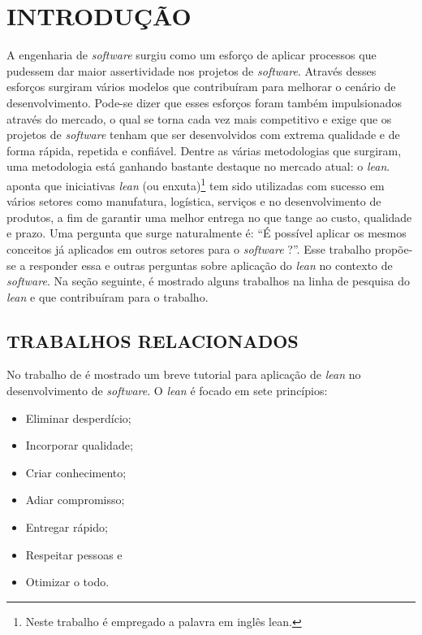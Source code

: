 \setcounter{page}{1}
\chapter{INTRODU\c{C}\~AO}  %
\label{chap:01}
A engenharia de \textit{software} surgiu como um esforço de aplicar processos que pudessem dar maior assertividade nos projetos de \textit{software}. Através desses esforços surgiram vários modelos que contribuíram para melhorar o cenário de desenvolvimento. Pode-se dizer que esses esforços foram também impulsionados através do mercado, o qual se torna cada vez mais competitivo e exige que os projetos de \textit{software} tenham que ser desenvolvidos com extrema qualidade e de forma rápida, repetida e confiável.
Dentre as várias metodologias que surgiram, uma metodologia está ganhando bastante destaque no mercado atual: o \textit{lean}.  aponta que iniciativas \textit{lean} (ou enxuta)\footnote{Neste trabalho é empregado a palavra em inglês lean.}  tem sido utilizadas com sucesso em vários setores como manufatura, logística, serviços e no desenvolvimento de produtos, a fim de garantir uma melhor entrega no que tange ao custo, qualidade e prazo. Uma pergunta que surge naturalmente é: “É possível aplicar os mesmos conceitos já aplicados em outros setores para o \textit{software} ?”. Esse trabalho propõe-se a responder essa e outras perguntas sobre aplicação do \textit{lean} no contexto de \textit{software}.
Na seção seguinte, é mostrado alguns trabalhos na linha de pesquisa do \textit{lean} e que contribuíram para o trabalho.

\section{TRABALHOS RELACIONADOS}

No trabalho  de  é mostrado um breve tutorial para aplicação de \textit{lean} no desenvolvimento de \textit{software}. O \textit{lean} é focado em sete princípios:

\begin{itemize}
	\item Eliminar desperdício;
	\item Incorporar qualidade;
	\item	Criar conhecimento;
	\item	Adiar compromisso;
	\item	Entregar rápido;
	\item	Respeitar pessoas e
	\item	Otimizar o todo.
\end{itemize}

